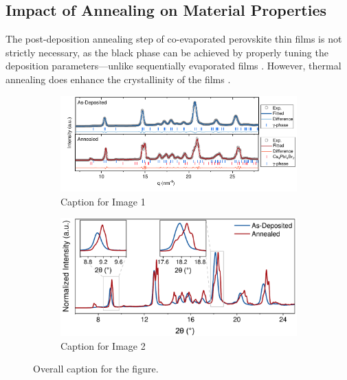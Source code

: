 \subsection{Impact of Annealing on Material Properties}

The post-deposition annealing step of co-evaporated perovskite thin films is not strictly necessary, as the black phase can be achieved by properly tuning the deposition parameters---unlike sequentially evaporated films \cite{DongGrowthFilm}. However, thermal annealing does enhance the crystallinity of the films \cite{Frolova2017HighlyPbIsub2/sub}. 

\begin{figure}[htbp]
    \centering
    \begin{subfigure}[b]{\textwidth}
    \centering
        \includegraphics[width=0.85\linewidth]{chapters/material_properties/images/GIWAXS_Before_After.pdf}
        \caption{Caption for Image 1}
        \label{fig:ch2:giwaxs_before_after:model}
    \end{subfigure}

    \vspace{0.5cm}
    
    \begin{subfigure}[b]{\textwidth}
    \centering
    \hspace{-1.4cm}
        \includegraphics[width=0.68\linewidth]{chapters/material_properties/images/giwaxs_overlayed.pdf}
        \caption{Caption for Image 2}
        \label{fig:ch2:giwaxs_before_after:overlay}
    \end{subfigure}
    
    \caption{Overall caption for the figure.}
    \label{fig:ch2:giwaxs_before_after:}
\end{figure}


